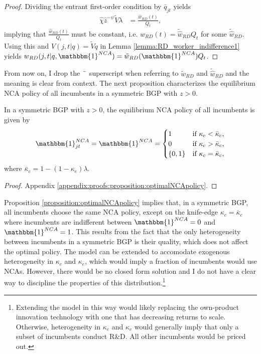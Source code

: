 \documentclass[ecta,nameyear,final]{econsocart}
\theoremstyle{plain}
\theoremstyle{remark}
\begin{document}
\begin{proof}
	Dividing the entrant first-order condition by $\bar{q}_{jt}$ yields
	\begin{align}
		\hat{\chi} \hat{z}^{-\psi} \tilde{V} \lambda &= \frac{\hat{w}_{RD}(t)}{Q_t},
	\end{align}
	implying that $\frac{\hat{w}_{RD}(t)}{Q_t}$ must be constant, i.e. $\hat{w}_{RD}(t) = \tilde{\hat{w}}_{RD} Q_t$ for some $\tilde{\hat{w}}_{RD}$. Using this and $V(j,t | q) = \tilde{V}q$ in Lemma \ref{lemma:RD_worker_indifference1} yields $w_{RD}(j,t|q, \mathbbm{1}^{NCA}) = \tilde{w}_{RD}(\mathbbm{1}^{NCA}) Q_t$. 
\end{proof}

From now on, I drop the $\hspace{1mm} \tilde{} \hspace{1mm}$ superscript when referring to $\tilde{w}_{RD}$ and $\tilde{\hat{w}}_{RD}$ and the meaning is clear from context. The next proposition characterizes the equilibrium NCA policy of all incumbents in a symmetric BGP with $z > 0$. 

\begin{proposition}\label{proposition:optimalNCApolicy}
	In a symmetric BGP with $z > 0$, the equilibrium NCA policy of all incumbents is given by 
	\begin{align}
		\mathbbm{1}^{NCA}_{jt} = \mathbbm{1}^{NCA} = \begin{cases}
			1 & \textrm{if } \kappa_{c} < \bar{\kappa}_c, \\
			0 & \textrm{if } \kappa_{c} > \bar{\kappa}_c , \\
			\{0,1\} & \textrm{if } \kappa_c = \bar{\kappa}_c , 
		\end{cases} \label{eq_nca_policy}
	\end{align}
	where $\bar{\kappa}_c  = 1 - (1-\kappa_e)\lambda$.
	
\end{proposition}


\begin{proof}
	Appendix \ref{appendix:proofs:proposition:optimalNCApolicy}. 
\end{proof}

Proposition \ref{proposition:optimalNCApolicy} implies that, in a symmetric BGP, all incumbents choose the same NCA policy, except on the knife-edge $\kappa_c = \bar{\kappa}_c$ where incumbents are indifferent between $\mathbbm{1}^{NCA} = 0$ and $\mathbbm{1}^{NCA} = 1$. This results from the fact that the only heterogeneity between incumbents in a symmetric BGP is their quality, which does not affect the optimal policy. The model can be extended to accomodate exogenous heterogeneity in $\kappa_c$ and $\kappa_e$, which would imply a fraction of incumbents would use NCAs. However, there would be no closed form solution and I do not have a clear way to discipline the properties of this distribution.\footnote{Extending the model in this way would likely replacing the own-product innovation technology with one that has decreasing returns to scale. Otherwise, heterogeneity in $\kappa_e$ and $\kappa_c$ would generally imply that only a subset of incumbents conduct R\&D. All other incumbents would be priced out.}
\end{document}
